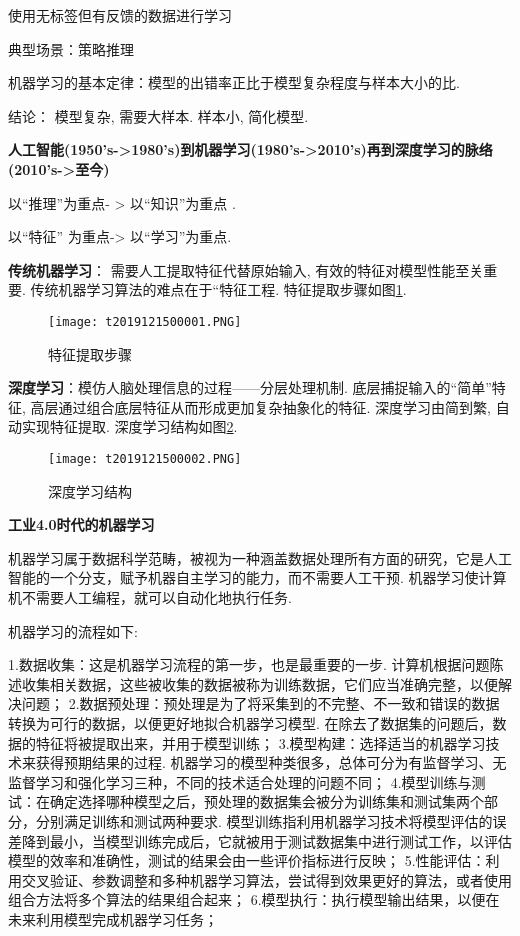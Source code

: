 \begin{tcolorbox}[colback=white!50,colframe=orange!50,title=强化学习( Reinforcement learning)]
使用无标签但有反馈的数据进行学习

典型场景：策略推理
\end{tcolorbox}

机器学习的基本定律：模型的出错率正比于模型复杂程度与样本大小的比.

结论： 模型复杂, 需要大样本. 样本小, 简化模型.

\textbf{人工智能(1950's->1980's)到机器学习(1980's->2010's)再到深度学习的脉络(2010's->至今)}
\begin{center}
以“推理”为重点- > 以“知识”为重点 .

以“特征” 为重点-> 以“学习”为重点.
\end{center}

\textbf{传统机器学习}： 需要人工提取特征代替原始输入, 有效的特征对模型性能至关重要. 传统机器学习算法的难点在于“特征工程. 特征提取步骤如图\ref{AI32fig2019121501}.
\begin{figure}[H]
\centering
\texttt{[image: t2019121500001.PNG]}
\caption{特征提取步骤}
\label{AI32fig2019121501}
\end{figure}

\textbf{深度学习}：模仿人脑处理信息的过程——分层处理机制. 底层捕捉输入的“简单”特征, 高层通过组合底层特征从而形成更加复杂抽象化的特征. 深度学习由简到繁, 自动实现特征提取. 深度学习结构如图\ref{AI32fig2019121502}.
\begin{figure}[H]
\centering
\texttt{[image: t2019121500002.PNG]}
\caption{深度学习结构}
\label{AI32fig2019121502}
\end{figure}
\textbf{工业4.0时代的机器学习}

机器学习属于数据科学范畴，被视为一种涵盖数据处理所有方面的研究，它是人工智能的一个分支，赋予机器自主学习的能力，而不需要人工干预. 机器学习使计算机不需要人工编程，就可以自动化地执行任务.

机器学习的流程如下:

1.数据收集：这是机器学习流程的第一步，也是最重要的一步. 计算机根据问题陈述收集相关数据，这些被收集的数据被称为训练数据，它们应当准确完整，以便解决问题；
2.数据预处理：预处理是为了将采集到的不完整、不一致和错误的数据转换为可行的数据，以便更好地拟合机器学习模型. 在除去了数据集的问题后，数据的特征将被提取出来，并用于模型训练；
3.模型构建：选择适当的机器学习技术来获得预期结果的过程. 机器学习的模型种类很多，总体可分为有监督学习、无监督学习和强化学习三种，不同的技术适合处理的问题不同；
4.模型训练与测试：在确定选择哪种模型之后，预处理的数据集会被分为训练集和测试集两个部分，分别满足训练和测试两种要求. 模型训练指利用机器学习技术将模型评估的误差降到最小，当模型训练完成后，它就被用于测试数据集中进行测试工作，以评估模型的效率和准确性，测试的结果会由一些评价指标进行反映；
5.性能评估：利用交叉验证、参数调整和多种机器学习算法，尝试得到效果更好的算法，或者使用组合方法将多个算法的结果组合起来；
6.模型执行：执行模型输出结果，以便在未来利用模型完成机器学习任务；

